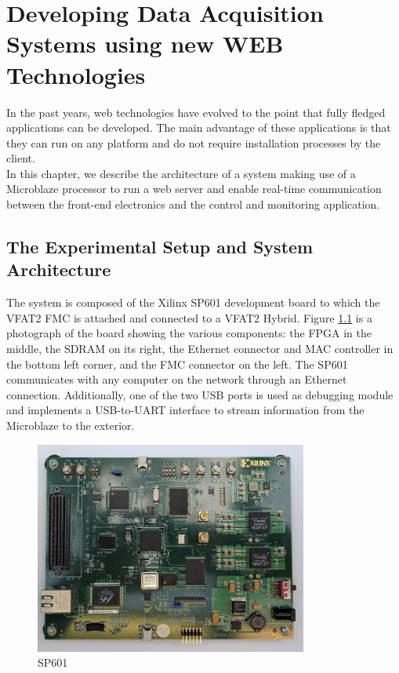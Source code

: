 \chapter{Developing Data Acquisition Systems using new WEB Technologies}
\label{chap:III-2-web-daq}

  In the past years, web technologies have evolved to the point that fully fledged applications can be developed. The main advantage of these applications is that they can run on any platform and do not require installation processes by the client. \\

  In this chapter, we describe the architecture of a system making use of a Microblaze processor to run a web server and enable real-time communication between the front-end electronics and the control and monitoring application.

  \section{The Experimental Setup and System Architecture}

    The system is composed of the Xilinx SP601 development board to which the VFAT2 FMC is attached and connected to a VFAT2 Hybrid. Figure \ref{fig:III-2-sp601} is a photograph of the board showing the various components: the FPGA in the middle, the SDRAM on its right, the Ethernet connector and MAC controller in the bottom left corner, and the FMC connector on the left. The SP601 communicates with any computer on the network through an Ethernet connection. Additionally, one of the two USB ports is used as debugging module and implements a USB-to-UART interface to stream information from the Microblaze to the exterior. \\

    \begin{figure}[h!]
      \centering
      \includegraphics[width=0.8\textwidth]{img/III-2-web-daq/sp601.jpg}
      \caption{SP601}
      \label{fig:III-2-sp601}
    \end{figure}

